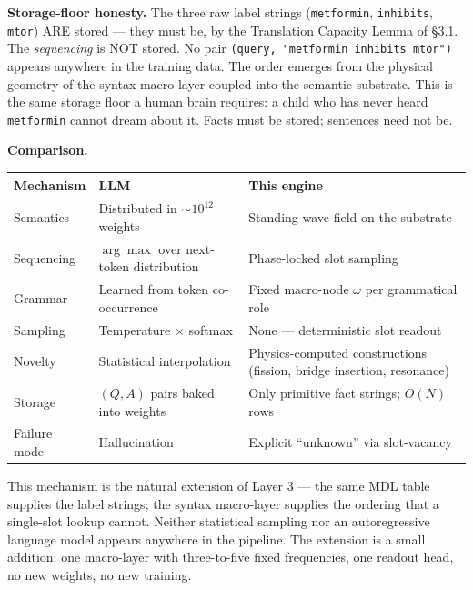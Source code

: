\documentclass[
  11pt,
  a4paper,
]{article}
\begin{document}
\textbf{Storage-floor honesty.} The three raw label strings
(\texttt{metformin}, \texttt{inhibits}, \texttt{mtor}) ARE stored ---
they must be, by the Translation Capacity Lemma of §3.1. The
\emph{sequencing} is NOT stored. No pair
\texttt{(query,\ "metformin\ inhibits\ mtor")} appears anywhere in the
training data. The order emerges from the physical geometry of the
syntax macro-layer coupled into the semantic substrate. This is the same
storage floor a human brain requires: a child who has never heard
\texttt{metformin} cannot dream about it. Facts must be stored;
sentences need not be.

\textbf{Comparison.}

\begin{longtable}[]{@{}
  >{\raggedright\arraybackslash}p{}
  >{\raggedright\arraybackslash}p{}
  >{\raggedright\arraybackslash}p{}@{}}
\toprule\noalign{}
\begin{minipage}[b]{\linewidth}\raggedright
Mechanism
\end{minipage} & \begin{minipage}[b]{\linewidth}\raggedright
LLM
\end{minipage} & \begin{minipage}[b]{\linewidth}\raggedright
This engine
\end{minipage} \\
\midrule\noalign{}
\endhead
\bottomrule\noalign{}
\endlastfoot
Semantics & Distributed in \(\sim 10^{12}\) weights & Standing-wave
field on the substrate \\
Sequencing & \(\arg\max\) over next-token distribution & Phase-locked
slot sampling \\
Grammar & Learned from token co-occurrence & Fixed macro-node \(\omega\)
per grammatical role \\
Sampling & Temperature \(\times\) softmax & None --- deterministic slot
readout \\
Novelty & Statistical interpolation & Physics-computed constructions
(fission, bridge insertion, resonance) \\
Storage & \((Q,A)\) pairs baked into weights & Only primitive fact
strings; \(O(N)\) rows \\
Failure mode & Hallucination & Explicit ``unknown'' via slot-vacancy \\
\end{longtable}

This mechanism is the natural extension of Layer 3 --- the same MDL
table supplies the label strings; the syntax macro-layer supplies the
ordering that a single-slot lookup cannot. Neither statistical sampling
nor an autoregressive language model appears anywhere in the pipeline.
The extension is a small addition: one macro-layer with three-to-five
fixed frequencies, one readout head, no new weights, no new training.
\end{document}
